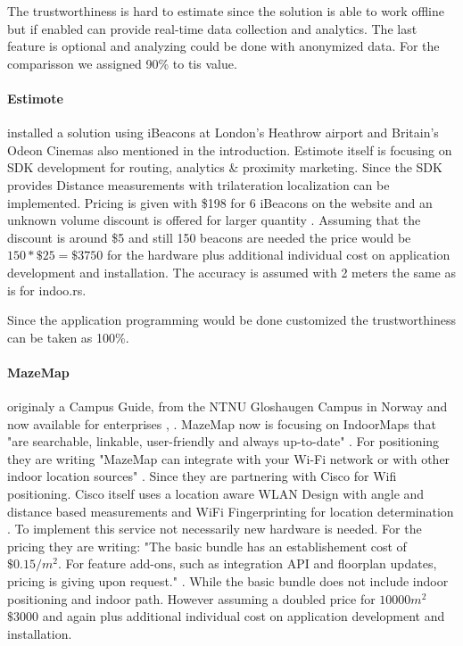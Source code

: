 The trustworthiness is hard to estimate since the solution is able to work offline but if enabled can provide real-time data collection and analytics. The last feature is optional and analyzing could be done with anonymized data. For the comparisson we assigned 90\% to tis value.


\paragraph{Estimote} installed a solution using iBeacons at London’s Heathrow airport and Britain’s Odeon Cinemas also mentioned in the introduction. Estimote itself is focusing on SDK development for routing, analytics \& proximity marketing. Since the SDK provides Distance measurements with trilateration localization can be implemented. Pricing is given with \$198 for 6 iBeacons on the website and an unknown volume discount is offered for larger quantity \parencite{estimote}. Assuming that the discount is around \$5 and still 150 beacons are needed the price would be $150*\$25=\$3750$ for the hardware plus additional individual cost on application development and installation. The accuracy is assumed with 2 meters the same as is for indoo.rs. 

Since the application programming would be done customized the trustworthiness can be taken as 100\%.


\paragraph{MazeMap} originaly a Campus Guide, from the NTNU Gloshaugen Campus in Norway and now available for enterprises \parencite{campusGuide1}, \parencite{mazemap}. MazeMap now is focusing on IndoorMaps that "are searchable, linkable, user-friendly and always up-to-date" \parencite{mazemap}.
For positioning they are writing "MazeMap can integrate with your Wi-Fi network or with other indoor location sources" \parencite{mazemap}. Since they are partnering with Cisco for Wifi positioning. Cisco itself uses a location aware WLAN Design with angle and distance based measurements and WiFi Fingerprinting for location determination \parencite{cisco}. 
To implement this service not necessarily new hardware is needed. For the pricing they are writing: "The basic bundle has an establishement cost of $\$0.15/m^2$. For feature add-ons, such as integration API and floorplan updates, pricing is giving upon request." \parencite{mazemap}. While the basic bundle does not include indoor positioning and indoor path. However assuming a doubled price for $10000m^2$ $\$3000$ and again plus additional individual cost on application development and installation.

